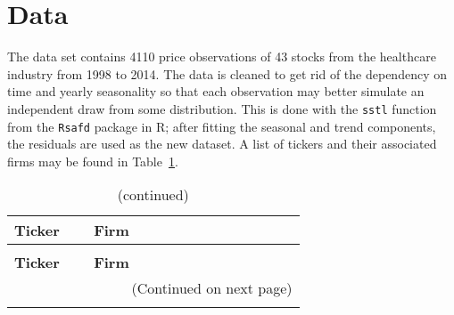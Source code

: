 \section{Data}
\label{sec:usage:data}

The data set contains 4110 price observations of 43 stocks from the healthcare 
industry from 1998 to 2014. The data is cleaned to get rid of the 
dependency on time and yearly seasonality so that each observation may better 
simulate an independent draw from some distribution. This is done 
with the \texttt{sstl} function from the \texttt{Rsafd} package in R; 
after fitting the seasonal and trend components, the residuals are used as the 
new dataset. A list of tickers and their associated firms may be found in 
Table~\ref{tab:usage:tickers}.

\newpage
\tablespacing
\begin{longtable}{p{0.15\linewidth} p{0.5\linewidth}}
	
	\caption[Healthcare firms and tickers.]{Healthcare firms and tickers.} 
	\label{tab:usage:tickers}\\
	\toprule
	\textbf{Ticker} & \textbf{Firm} \\
	\midrule
	\endfirsthead
	
	\caption[]{(continued)}\\
	\toprule
	\textbf{Ticker} & \textbf{Firm} \\
	\midrule
	\endhead
	
	\midrule
	\multicolumn{2}{r}{(Continued on next page)}\\
	\endfoot
	
	\bottomrule
	\endlastfoot
	

\end{longtable}
